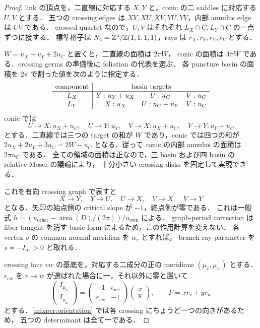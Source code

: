 \begin{proof}
link の頂点を，二直線に対応する $X,Y$ と，conic の二 saddles に対応する $U,V$ とする．
五つの crossing edges は $XY,XU,XV,YU,YV$，内部 annulus edge は $UV$ である．
crossed quartet なので，$U,V$ はそれぞれ $L_X\cap C,L_Y\cap C$ の一点ずつに接する．
標準格子は $N_4=\mathbb Z^4/\mathbb Z(1,1,1,1)$，rays は
$r_X,r_Y,r_U,r_V$ とする．

$W=u_X+u_Y+2u_C$ と置くと，二直線の面積は $2\pi W$，
conic の面積は $4\pi W$ である．crossing germs の準備後に foliation の代表を選ぶ．
各 puncture basin の面積を $2\pi$ で割った値を次のように指定する．
\[
\begin{array}{c|ccc}
 \text{component}&\multicolumn{3}{c}{\text{basin targets}}\\\hline
 L_X&Y:u_Y+u_X&U:u_C&V:u_C\\
 L_Y&X:u_X&U:u_C+u_Y&V:u_C
\end{array}
\]
conic では
\[
 U\to X:u_X+u_C,\quad U\to Y:u_Y,\quad
 V\to X:u_X+u_C,\quad V\to Y:u_Y+u_C
\]
とする．二直線では三つの target の和が $W$ であり，conic では四つの和が
$2u_X+2u_Y+3u_C=2W-u_C$ となる．従って conic の内部 annulus の面積は $2\pi u_C$ である．
全ての領域の面積は正なので，三 basin および四 basin の relative Moser の議論により，
十分小さい crossing disks を固定して実現できる．

これを有向 crossing graph で表すと
\begin{equation}\label{mixper:orientation}
 X\longrightarrow Y,\quad Y\longrightarrow U,\quad
 U\longrightarrow X,\quad V\longrightarrow X,\quad V\longrightarrow Y
\end{equation}
となる．矢印の始点側の critical slope が $-1$，終点側が零である．
これは一般式 $h=(u_{\mathrm{other}}-\operatorname{area}(D)/(2\pi))/u_{\mathrm{own}}$ による．
graph-period correction は fiber tangent を消す basic form によるため，この作用計算を変えない．
各 vertex $v$ の common normal meridian を $\alpha_v$ とすれば，
branch ray parameter を $s=-I_{\alpha_v}>0$ と取れる．

crossing face $vw$ の基底を，対応する二成分の正の meridians $(\mu_v,\mu_w)$ とする．
$\epsilon_{vw}$ を $v\to w$ が選ばれた場合に一，それ以外に零と置いて
\[
 \begin{pmatrix}I_{\mu_v}\\I_{\mu_w}\end{pmatrix}
 =\begin{pmatrix}-1&\epsilon_{wv}\\\epsilon_{vw}&-1\end{pmatrix}
   \begin{pmatrix}x\\y\end{pmatrix},\qquad
 F=xr_v+yr_w
\]
とする．\eqref{mixper:orientation} では各 crossing にちょうど一つの向きがあるため，
五つの determinant は全て一である．


\end{proof}
